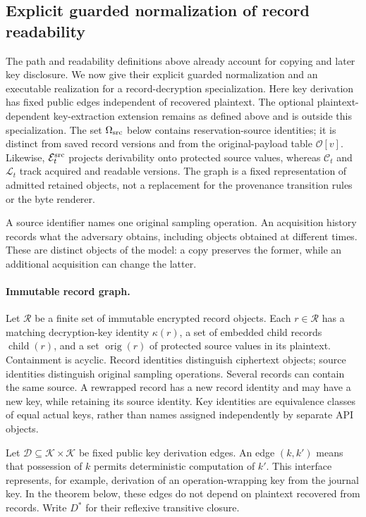 \subsection{Explicit guarded normalization of record readability}
\label{sec:guarded-provenance}

The path and readability definitions above already account for copying and
later key disclosure. We now give their explicit guarded normalization and
an executable realization for a record-decryption specialization. Here key
derivation has fixed public edges independent of recovered plaintext. The
optional plaintext-dependent key-extraction extension remains as defined
above and is outside this specialization. The set $\Omega_{\rm src}$ below
contains reservation-source identities; it is distinct from saved record
versions and from the original-payload table $\mathcal O[v]$. Likewise,
$\mathcal E^{\rm src}_t$ projects derivability onto protected source values,
whereas $\mathcal C_t$ and $\mathcal L_t$ track acquired and readable versions.
The graph is a fixed representation of admitted retained objects, not a
replacement for the provenance transition rules or the byte renderer.


A source identifier names one original sampling operation.  An acquisition
history records what the adversary obtains, including objects obtained at
different times.  These are distinct objects of the model: a copy preserves
the former, while an additional acquisition can change the latter.

\paragraph{Immutable record graph.}
Let $\mathcal R$ be a finite set of immutable encrypted record objects.
Each $r\in\mathcal R$ has a matching decryption-key identity $\kappa(r)$,
a set of embedded child records $\operatorname{child}(r)$, and a set
$\operatorname{orig}(r)$ of protected source values in its plaintext.
Containment is acyclic.  Record identities distinguish ciphertext objects;
source identities distinguish original sampling operations.  Several
records can contain the same source.  A rewrapped record has a new record
identity and may have a new key, while retaining its source identity.
Key identities are equivalence classes of equal actual keys, rather than
names assigned independently by separate API objects.

Let $\mathcal D\subseteq\mathcal K\times\mathcal K$ be fixed public key
derivation edges.  An edge $(k,k')$ means that possession of $k$ permits
deterministic computation of $k'$.  This interface represents, for example,
derivation of an operation-wrapping key from the journal key.  In the
theorem below, these edges do not depend on plaintext recovered from records.
Write $D^*$ for their reflexive transitive closure.

